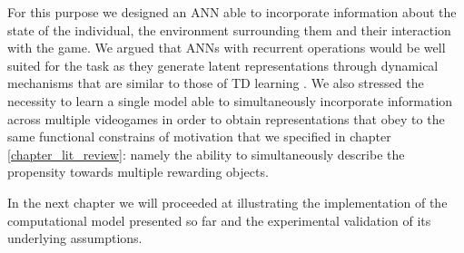 For this purpose we designed an ANN able to incorporate information about the state of the individual, the environment surrounding them and their interaction with the game. We argued that ANNs with recurrent operations would be well suited for the task as they generate latent representations through dynamical mechanisms that are similar to those of TD learning \cite{barto2004reinforcement}. We also stressed the necessity to learn a single model able to simultaneously incorporate information across multiple videogames in order to obtain representations that obey to the same functional constrains of motivation that we specified in chapter \ref{chapter_lit_review}: namely the ability to simultaneously describe the propensity towards multiple rewarding objects. 

In the next chapter we will proceeded at illustrating the implementation of the computational model presented so far and the experimental validation of its underlying assumptions.